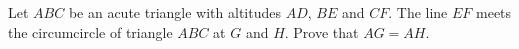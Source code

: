Let $ABC$ be an acute triangle with altitudes $AD$, $BE$ and $CF$. The line $EF$ meets the circumcircle of triangle $ABC$ at $G$ and $H$. Prove that $AG=AH$.
